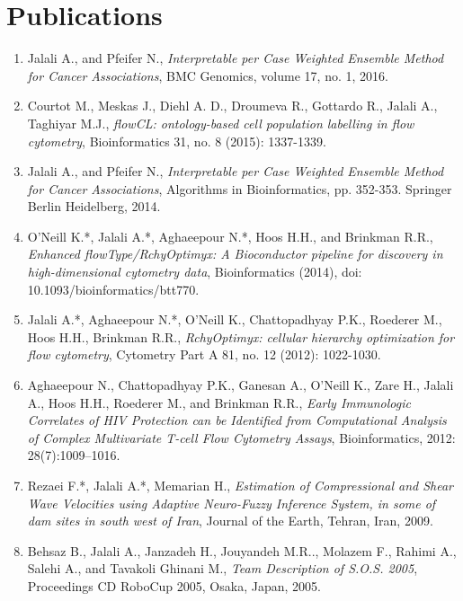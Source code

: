 \documentclass[11pt,a4paper,sans]{moderncv} %
\begin{document}

\section{Publications}

\begin{enumerate}
\item Jalali A., and Pfeifer N., \emph{Interpretable per Case Weighted Ensemble Method for Cancer Associations}, BMC Genomics, volume 17, no. 1, 2016.

\item Courtot M., Meskas J., Diehl A. D., Droumeva R., Gottardo R., Jalali A., Taghiyar M.J., \emph{flowCL: ontology-based cell population labelling in flow cytometry}, Bioinformatics 31, no. 8 (2015): 1337-1339.

\item Jalali A., and Pfeifer N., \emph{Interpretable per Case Weighted Ensemble Method for Cancer Associations}, Algorithms in Bioinformatics, pp. 352-353. Springer Berlin Heidelberg, 2014.

\item O'Neill K.*, Jalali A.*, Aghaeepour N.*, Hoos H.H., and Brinkman R.R., \emph{Enhanced flowType/RchyOptimyx: A Bioconductor pipeline for discovery in high-dimensional cytometry data}, Bioinformatics (2014), doi: 10.1093/bioinformatics/btt770.

\item Jalali A.*, Aghaeepour N.*, O'Neill K., Chattopadhyay P.K., Roederer M., Hoos H.H., Brinkman R.R., \emph{RchyOptimyx: cellular hierarchy optimization for flow cytometry}, Cytometry Part A 81, no. 12 (2012): 1022-1030.

\item Aghaeepour N., Chattopadhyay P.K., Ganesan A., O'Neill K., Zare H., Jalali A., Hoos H.H., Roederer M., and Brinkman R.R., \emph{Early Immunologic Correlates of HIV Protection can be Identiﬁed from Computational Analysis of Complex Multivariate T-cell Flow Cytometry Assays},
Bioinformatics, 2012: 28(7):1009–1016.

\item Rezaei F.*, Jalali A.*, Memarian H., \emph{Estimation of Compressional and Shear Wave Velocities using Adaptive Neuro-Fuzzy Inference System, in some of dam sites in south west of Iran}, Journal of the Earth, Tehran, Iran, 2009.

\item Behsaz B., Jalali A., Janzadeh H., Jouyandeh M.R.., Molazem F., Rahimi A., Salehi A., and Tavakoli Ghinani M., \emph{Team Description of S.O.S. 2005}, Proceedings CD RoboCup 2005, Osaka, Japan, 2005.
  

\end{enumerate}
\end{document}
